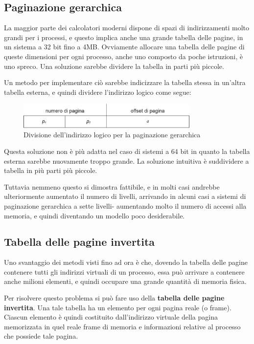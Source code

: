     \subsection{Paginazione gerarchica}
        La maggior parte dei calcolatori moderni dispone di spazi di indirizzamenti molto grandi per i processi, e questo implica anche una grande tabella delle pagine, in un sistema a 32 bit fino a 4MB. Ovviamente allocare una tabella delle pagine di queste dimensioni per ogni processo, anche uno composto da poche istruzioni, è uno spreco. Una soluzione sarebbe dividere la tabella in parti più piccole.
        
        Un metodo per implementare ciò sarebbe indicizzare la tabella stessa in un'altra tabella esterna, e quindi dividere l'indirizzo logico come segue:
        
        \begin{figure}[h]
            \centering
            \includegraphics[width =0.8\textwidth]{img/paginazione.png}
            \caption{Divisione dell'indirizzo logico per la paginazione gerarchica}
            \label{fig:my_label}
        \end{figure}
        
        Questa soluzione non è più adatta nel caso di sistemi a 64 bit in quanto la tabella esterna sarebbe nuovamente troppo grande. La soluzione intuitiva è suddividere a tabella in più parti più piccole.
        
        Tuttavia nemmeno questo si dimostra fattibile, e in molti casi andrebbe ulteriormente aumentato il numero di livelli, arrivando in alcuni casi a sistemi di paginazione gerarchica a sette livelli- aumentando molto il numero di accessi alla memoria, e quindi diventando un modello poco desiderabile.
        
    \subsection{Tabella delle pagine invertita}
        Uno svantaggio dei metodi visti fino ad ora è che, dovendo la tabella delle pagine contenere tutti gli indirizzi virtuali di un processo, essa può arrivare a contenere anche milioni elementi, e quindi occupare una grande quantità di memoria fisica.
        
        Per risolvere questo problema si può fare uso della \textbf{tabella delle pagine invertita}. Una tale tabella ha un elemento per ogni pagina reale (o frame). Ciascun elemento è quindi costituito dall'indirizzo virtuale della pagina memorizzata in quel reale frame di memoria e informazioni relative al processo che possiede tale pagina.
        

